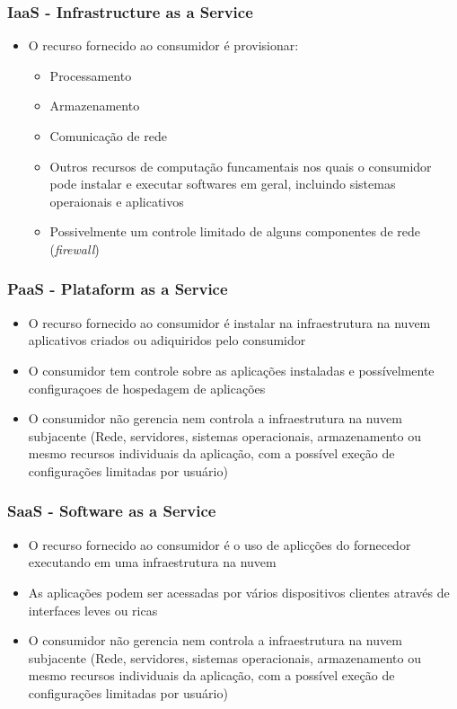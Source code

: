 \begin{frame}
	\frametitle{IaaS - Infrastructure as a Service}
	\begin{itemize}
		\item O recurso fornecido ao consumidor é provisionar:
			\begin{itemize}
				\item Processamento
				\item Armazenamento
				\item Comunicação de rede
				\item Outros recursos de computação funcamentais nos quais o consumidor pode instalar e executar softwares em geral, incluindo sistemas operaionais e aplicativos
				\item Possivelmente um controle limitado de alguns componentes de rede (\textit{firewall})
			\end{itemize}
	\end{itemize}
\end{frame}

\begin{frame}
	\frametitle{PaaS - Plataform as a Service}
	\begin{itemize}
		\item O recurso fornecido ao consumidor é instalar na infraestrutura na nuvem aplicativos criados ou adiquiridos pelo consumidor
		\item O consumidor tem controle sobre as aplicações instaladas e possívelmente configuraçoes de hospedagem de aplicações
		\item O consumidor não gerencia nem controla a infraestrutura na nuvem subjacente (Rede, servidores, sistemas operacionais, armazenamento ou mesmo recursos individuais da aplicação, com a possível exeção de configurações limitadas por usuário)
	\end{itemize}
\end{frame}

\begin{frame}
	\frametitle{SaaS - Software as a Service}
	\begin{itemize}
		\item O recurso fornecido ao consumidor é o uso de aplicções do fornecedor executando em uma infraestrutura na nuvem
		\item As aplicações podem ser acessadas por vários dispositivos clientes através de interfaces leves ou ricas
		\item O consumidor não gerencia nem controla a infraestrutura na nuvem subjacente (Rede, servidores, sistemas operacionais, armazenamento ou mesmo recursos individuais da aplicação, com a possível exeção de configurações limitadas por usuário)
	\end{itemize}
\end{frame}


